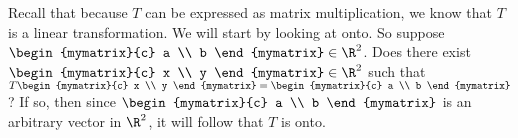\begin{solution} Recall that because $T$ can be expressed as matrix
multiplication, we know that $T$ is a linear transformation.  We will
start by looking at onto.  So suppose $\begin{mymatrix}{c}
a \\
b
\end{mymatrix} \in \R^{2}$. Does there exist $\begin{mymatrix}{c}
x \\
y
\end{mymatrix}  \in \R^2 $ such that $T\begin{mymatrix}{c}
x \\
y
\end{mymatrix} =\begin{mymatrix}{c}
a \\
b
\end{mymatrix}$? If so, then since $\begin{mymatrix}{c}
a \\
b
\end{mymatrix} $ is an arbitrary vector in $\R^{2}$, it will follow that $T$
is onto. 


\end{solution}
